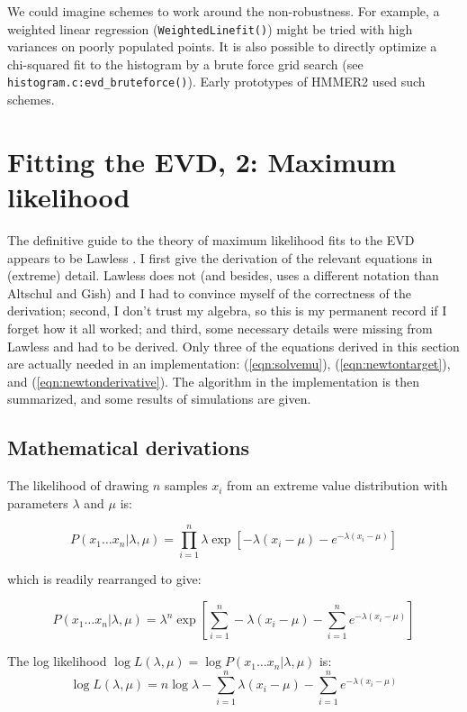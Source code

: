We could imagine schemes to work around the non-robustness. For
example, a weighted linear regression ({\tt WeightedLinefit()}) might
be tried with high variances on poorly populated points.  It is also
possible to directly optimize a chi-squared fit to the histogram by a
brute force grid search (see {\tt histogram.c:evd\_bruteforce()}).
Early prototypes of HMMER2 used such schemes.

\section{Fitting the EVD, 2: Maximum likelihood}

The definitive guide to the theory of maximum likelihood fits to the
EVD appears to be Lawless \cite{Lawless82}. I first give the
derivation of the relevant equations in (extreme) detail. Lawless does
not (and besides, uses a different notation than Altschul and Gish)
and I had to convince myself of the correctness of the derivation;
second, I don't trust my algebra, so this is my permanent record if I
forget how it all worked; and third, some necessary details were
missing from Lawless and had to be derived. Only three of the
equations derived in this section are actually needed in an
implementation: (\ref{eqn:solvemu}), (\ref{eqn:newtontarget}), and
(\ref{eqn:newtonderivative}).  The algorithm in the implementation is
then summarized, and some results of simulations are given.

\subsection{Mathematical derivations}

The likelihood of drawing $n$ samples $x_i$ from an extreme value
distribution with parameters $\lambda$ and $\mu$ is:

\[
P(x_1 \ldots x_n | \lambda, \mu) = 
\prod_{i=1}^{n} \lambda \exp \left[ 
-\lambda(x_i - \mu) - e^{-\lambda(x_i - \mu)} \right]
\]

which is readily rearranged to give:

\begin{equation}
P(x_1 \ldots x_n | \lambda, \mu) =
\lambda^n \exp \left[ \sum_{i=1}^{n} -\lambda(x_i - \mu) 
	- \sum_{i=1}^{n} e^{-\lambda(x_i - \mu)} \right]
\end{equation}

The log likelihood $\log L(\lambda, \mu) = \log P(x_1 \ldots x_n | \lambda, \mu)$ is:
\begin{equation}
\log L(\lambda, \mu) = 
n \log \lambda - \sum_{i=1}^{n} \lambda(x_i - \mu) 
- \sum_{i=1}^{n} e^{-\lambda(x_i - \mu)}
\label{eqn:logL}
\end{equation}

